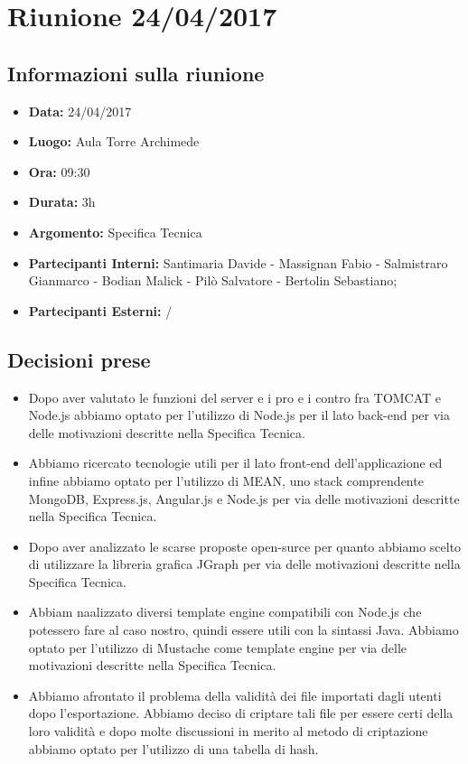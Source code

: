 \section{Riunione 24/04/2017}
  \subsection{Informazioni sulla riunione}
    \begin{itemize}
      \item \textbf{Data: }24/04/2017
      \item \textbf{Luogo: }Aula Torre Archimede
      \item \textbf{Ora: }09:30
      \item \textbf{Durata: }3h
      \item \textbf{Argomento: }Specifica Tecnica
      \item \textbf{Partecipanti Interni: }Santimaria Davide - Massignan Fabio - Salmistraro Gianmarco - Bodian Malick - Pilò Salvatore - Bertolin Sebastiano;
      \item \textbf{Partecipanti Esterni: }/
    \end{itemize}
  \subsection{Decisioni prese}
		\begin{itemize}
			\item Dopo aver valutato le funzioni del server
				e i pro e i contro fra TOMCAT e Node.js abbiamo optato per l'utilizzo di Node.js per il lato back-end per via delle motivazioni descritte nella Specifica Tecnica.
			\item Abbiamo ricercato tecnologie utili per il lato front-end dell'applicazione ed infine abbiamo optato
				per l'utilizzo di MEAN, uno stack comprendente MongoDB, Express.js, Angular.js e Node.js per via delle motivazioni descritte nella Specifica Tecnica.
			\item Dopo aver analizzato le scarse  proposte open-surce per quanto abbiamo scelto di
				utilizzare la libreria grafica JGraph per via delle motivazioni descritte nella Specifica Tecnica.
			\item Abbiam naalizzato diversi template engine compatibili con Node.js che potessero fare al caso nostro,
				quindi essere utili con la sintassi Java.
				Abbiamo optato per l'utilizzo di Mustache come template engine per via delle motivazioni descritte nella Specifica Tecnica.
			\item Abbiamo afrontato il problema della validità dei file importati dagli utenti dopo l'esportazione.
				Abbiamo deciso di criptare tali file per essere certi della loro validità e dopo molte discussioni in merito al metodo di criptazione
				abbiamo optato per l'utilizzo di una tabella di hash.
		\end{itemize}
